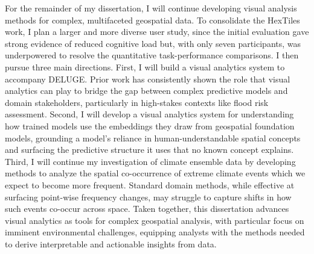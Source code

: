 For the remainder of my dissertation, I will continue developing visual analysis methods for complex, multifaceted geospatial data. To consolidate the HexTiles work, I plan a larger and more diverse user study, since the initial evaluation gave strong evidence of reduced cognitive load but, with only seven participants, was underpowered to resolve the quantitative task-performance comparisons. I then pursue three main directions. First, I will build a visual analytics system to accompany DELUGE. Prior work has consistently shown the role that visual analytics can play to bridge the gap between complex predictive models and domain stakeholders, particularly in high-stakes contexts like flood risk assessment. 
Second, I will develop a visual analytics system for understanding how trained models use the embeddings they draw from geospatial foundation models, grounding a model's reliance in human-understandable spatial concepts and surfacing the predictive structure it uses that no known concept explains. Third, I will continue my investigation of climate ensemble data by developing methods to analyze the spatial co-occurrence of extreme climate events which we expect to become more frequent. Standard domain methods, while effective at surfacing point-wise frequency changes, may struggle to capture shifts in how such events co-occur across space. Taken together, this dissertation advances visual analytics as tools for complex geospatial analysis, with particular focus on imminent environmental challenges, equipping analysts with the methods needed to derive interpretable and actionable insights from data.

